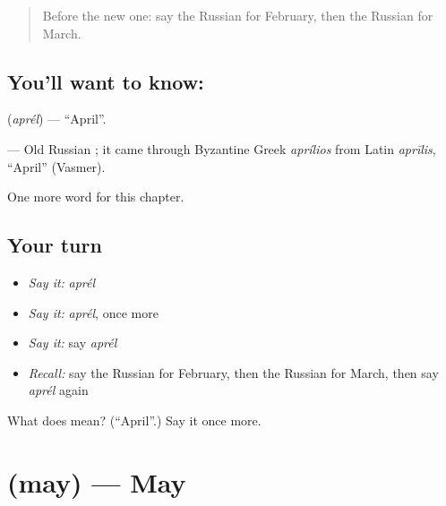 \label{lesson:RU-C181-aprel}



\begin{quote}
Before the new one: say the Russian for February, then the Russian for March.
\end{quote}

\subsection*{You'll want to know: }
\textbf{} (\emph{aprél}) — \textquotedblleft{}April\textquotedblright{}.

\begin{cousinweb}
\textbf{} — Old Russian \emph{}; it came through Byzantine Greek \emph{aprílios} from Latin \emph{aprīlis}, \textquotedblleft{}April\textquotedblright{} (Vasmer).
\end{cousinweb}

\begin{grammarlens}[title={What you've built}]
One more word for this chapter.
\end{grammarlens}

\subsection*{Your turn}
\begin{itemize}
\raggedright
  \item \emph{Say it:} \emph{aprél}
  \item \emph{Say it:} \emph{aprél}, once more
  \item \emph{Say it:} say \emph{aprél}
  \item \emph{Recall:} say the Russian for February, then the Russian for March, then say \emph{aprél} again
\end{itemize}

\begin{tcolorbox}[breakable,colback=teal!4,colframe=teal!35!black,title={Before you move on}]
What does  mean? (\textquotedblleft{}April\textquotedblright{}.) Say it once more.
\end{tcolorbox}
\section[\texorpdfstring{\ru{май} (may)}{май (may)}]{ (may) — May}

\label{lesson:RU-C181-may}



